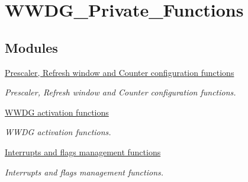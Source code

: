 \hypertarget{group___w_w_d_g___private___functions}{\section{W\-W\-D\-G\-\_\-\-Private\-\_\-\-Functions}
\label{group___w_w_d_g___private___functions}
}
\subsection*{Modules}
\begin{DoxyCompactItemize}
\item 
\hyperlink{group___w_w_d_g___group1}{Prescaler, Refresh window and Counter configuration functions}
\begin{DoxyCompactList}\small\item\em Prescaler, Refresh window and Counter configuration functions. \end{DoxyCompactList}\item 
\hyperlink{group___w_w_d_g___group2}{W\-W\-D\-G activation functions}
\begin{DoxyCompactList}\small\item\em W\-W\-D\-G activation functions. \end{DoxyCompactList}\item 
\hyperlink{group___w_w_d_g___group3}{Interrupts and flags management functions}
\begin{DoxyCompactList}\small\item\em Interrupts and flags management functions. \end{DoxyCompactList}\end{DoxyCompactItemize}
